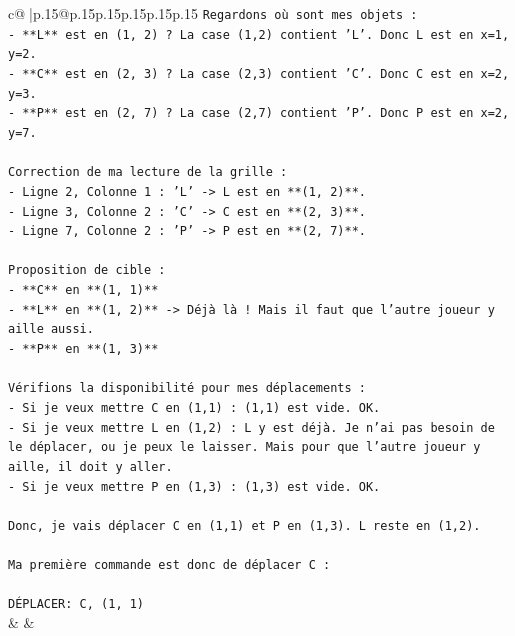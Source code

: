 \documentclass{article}
\begin{document}
{\begin{supertabular}{c@{$\;$}|p{.15\linewidth}@{}p{.15\linewidth}p{.15\linewidth}p{.15\linewidth}p{.15\linewidth}p{.15\linewidth}}
{{{\texttt{Regardons où sont mes objets :} \\
\texttt{{-} **L** est en (1, 2) ? La case (1,2) contient 'L'. Donc L est en x=1, y=2.} \\
\texttt{{-} **C** est en (2, 3) ? La case (2,3) contient 'C'. Donc C est en x=2, y=3.} \\
\texttt{{-} **P** est en (2, 7) ? La case (2,7) contient 'P'. Donc P est en x=2, y=7.} \\
\\ 
\texttt{Correction de ma lecture de la grille :} \\
\texttt{{-} Ligne 2, Colonne 1 : 'L' {-}> L est en **(1, 2)**.} \\
\texttt{{-} Ligne 3, Colonne 2 : 'C' {-}> C est en **(2, 3)**.} \\
\texttt{{-} Ligne 7, Colonne 2 : 'P' {-}> P est en **(2, 7)**.} \\
\\ 
\texttt{Proposition de cible :} \\
\texttt{{-} **C** en **(1, 1)**} \\
\texttt{{-} **L** en **(1, 2)** {-}> Déjà là ! Mais il faut que l'autre joueur y aille aussi.} \\
\texttt{{-} **P** en **(1, 3)**} \\
\\ 
\texttt{Vérifions la disponibilité pour mes déplacements :} \\
\texttt{{-} Si je veux mettre C en (1,1) : (1,1) est vide. OK.} \\
\texttt{{-} Si je veux mettre L en (1,2) : L y est déjà. Je n'ai pas besoin de le déplacer, ou je peux le laisser. Mais pour que l'autre joueur y aille, il doit y aller.} \\
\texttt{{-} Si je veux mettre P en (1,3) : (1,3) est vide. OK.} \\
\\ 
\texttt{Donc, je vais déplacer C en (1,1) et P en (1,3). L reste en (1,2).} \\
\\ 
\texttt{Ma première commande est donc de déplacer C :} \\
\\ 
\texttt{DÉPLACER: C, (1, 1)} \\
            }
        }
    }
    & & \\ \\


\end{supertabular}}
\end{document}
